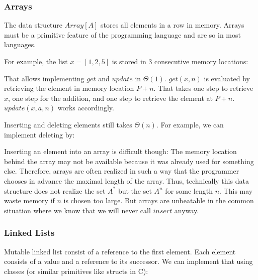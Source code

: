 \subsubsection{Arrays}

The data structure $Array[A]$ stores all elements in a row in memory.
Arrays must be a primitive feature of the programming language and are so in most languages.

For example, the list $x=[1,2,5]$ is stored in $3$ consecutive memory locations:
\begin{amemory}
\alocations
{}
\end{amemory}

That allows implementing $get$ and $update$ in $\Theta(1)$.
$get(x,n)$ is evaluated by retrieving the element in memory location $P+n$.
That takes one step to retrieve $x$, one step for the addition, and one step to retrieve the element at $P+n$.
$update(x,a,n)$ works accordingly.

Inserting and deleting elements still takes $\Theta(n)$.
For example, we can implement deleting by:
\begin{acode}
\end{acode}

Inserting an element into an array is difficult though: The memory location behind the array may not be available because it was already used for something else.
Therefore, arrays are often realized in such a way that the programmer chooses in advance the maximal length of the array.
Thus, technically this data structure does not realize the set $A^*$ but the set $A^n$ for some length $n$.
This may waste memory if $n$ is chosen too large.
But arrays are unbeatable in the common situation where we know that we will never call $insert$ anyway.

\subsubsection{Linked Lists}

Mutable linked list consist of a reference to the first element.
Each element consists of a value and a reference to its successor.
We can implement that using classes (or similar primitives like structs in C):
\begin{acode}
\\
\end{acode}

